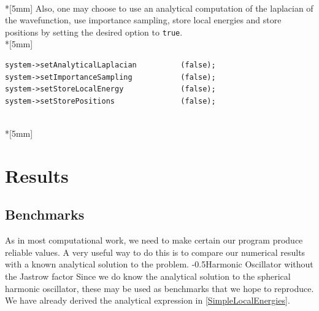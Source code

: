 \documentclass[english, a4paper]{article}
\makeatletter
\renewcommand{\subsubsection}{\@startsection{subsubsection}{3}{0pt}%
{-\baselineskip}{0.5\baselineskip}{\bf\large}}
\makeatother
\begin{document}
\\*[5mm]
Also, one may choose to use an analytical computation of the laplacian of the wavefunction, use importance sampling, store local energies and store positions by setting the desired option to \texttt{true}.\\*[5mm]
\begin{verbatim}
system->setAnalyticalLaplacian          (false);
system->setImportanceSampling           (false);
system->setStoreLocalEnergy             (false);
system->setStorePositions               (false);
\end{verbatim}
\\*[5mm]


\section{Results}


\subsection{Benchmarks}
As in most computational work, we need to make certain our program produce reliable values. 
A very useful way to do this is to compare our numerical results with a known analytical solution to the problem. 
\subsubsection{Harmonic Oscillator without the Jastrow factor}
Since we do know the analytical solution to the spherical harmonic oscillator, these may be used as benchmarks that we hope to reproduce.
We have already derived the analytical expression in \eqref{SimpleLocalEnergies}. 
\end{document}
